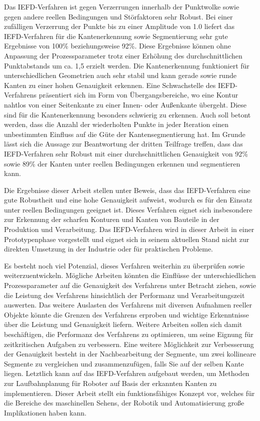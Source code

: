 Das IEFD-Verfahren ist gegen Verzerrungen innerhalb der Punktwolke sowie gegen andere reellen Bedingungen und Störfaktoren sehr Robust. Bei einer zufälligen Verzerrung der Punkte bis zu einer Amplitude von 1.0 liefert das IEFD-Verfahren für die Kantenerkennung sowie Segmentierung sehr gute Ergebnisse von 100\% beziehungsweise 92\%. Diese Ergebnisse können ohne Anpassung der Prozessparameter trotz einer Erhöhung des durchschnittlichen Punktabstands um ca. 1,5 erzielt werden. Die Kantenerkennung funktioniert für unterschiedlichen Geometrien auch sehr stabil und kann gerade sowie runde Kanten zu einer hohen Genauigkeit erkennen. Eine Schwachstelle des IEFD-Verfahrens präsentiert sich im Form von Übergangsbereiche, wo eine Kontur nahtlos von einer Seitenkante zu einer Innen- oder Außenkante übergeht. Diese sind für die Kantenerkennung besonders schwierig zu erkennen. Auch soll betont werden, dass die Anzahl der wiederholten Punkte in jeder Iteration einen unbestimmten Einfluss auf die Güte der Kantensegmentierung hat. Im Grunde lässt sich die Aussage zur Beantwortung der dritten Teilfrage treffen, dass das IEFD-Verfahren sehr Robust mit einer durchschnittlichen Genauigkeit von 92\% sowie 89\% der Kanten unter reellen Bedingungen erkennen und segmentieren kann. 

Die Ergebnisse dieser Arbeit stellen unter Beweis, dass das IEFD-Verfahren eine gute Robustheit und eine hohe Genauigkeit aufweist, wodurch es für den Einsatz unter reellen Bedingungen geeignet ist. Dieses Verfahren eignet sich insbesondere zur Erkennung der scharfen Konturen und Kanten von Bauteile in der Produktion und Verarbeitung. Das IEFD-Verfahren wird in dieser Arbeit in einer Prototypenphase vorgestellt und eignet sich in seinem aktuellen Stand nicht zur direkten Umsetzung in der Industrie oder für praktischen Probleme. 

Es besteht noch viel Potenzial, dieses Verfahren weiterhin zu überprüfen sowie weiterzuentwickeln. Mögliche Arbeiten könnten die Einflüsse der unterschiedlichen Prozessparameter auf die Genauigkeit des Verfahrens unter Betracht ziehen, sowie die Leistung des Verfahrens hinsichtlich der Performanz und Verarbeitungszeit auswerten. Das weitere Auslasten des Verfahrens mit diversen Aufnahmen reeller Objekte könnte die Grenzen des Verfahrens erproben und wichtige Erkenntnisse über die Leistung und Genauigkeit liefern. Weitere Arbeiten sollen sich damit beschäftigen, die Performanz des Verfahrens zu optimieren, um seine Eignung für zeitkritischen Aufgaben zu verbessern. Eine weitere Möglichkeit zur Verbesserung der Genauigkeit besteht in der Nachbearbeitung der Segmente, um zwei kollineare Segmente zu vergleichen und zusammenzufügen, falls Sie auf der selben Kante liegen. Letztlich kann auf das IEFD-Verfahren aufgebaut werden, um Methoden zur Laufbahnplanung für Roboter auf Basis der erkannten Kanten zu implementieren. Dieser Arbeit stellt ein funktionsfähiges Konzept vor, welches für die Bereiche des maschinellen Sehens, der Robotik und Automatisierung große Implikationen haben kann.